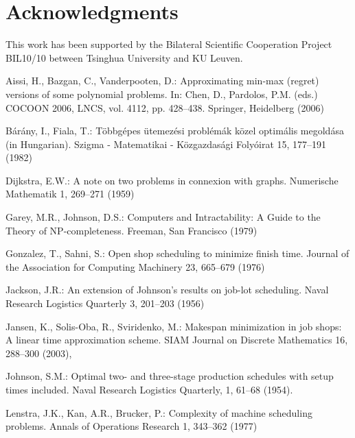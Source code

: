 \documentclass{llncs}
\numberwithin{subcase}{case}
\begin{document}
\section*{Acknowledgments}
This work has been supported by the Bilateral Scientific Cooperation Project BIL10/10 between Tsinghua University and KU Leuven.




\begin{thebibliography}{10}
\providecommand{\url}[1]{\texttt{#1}}
\providecommand{\urlprefix}{URL }

Aissi, H., Bazgan, C., Vanderpooten, D.: Approximating min-max (regret)
  versions of some polynomial problems. In: Chen, D., Pardolos, P.M. (eds.)
  COCOON 2006, LNCS, vol. 4112, pp. 428--438. Springer, Heidelberg (2006)

B{\' a}r{\' a}ny, I., Fiala, T.: T{\" o}bbg{\' e}pes {\" u}temez{\' e}si
  probl{\' e}m{\' a}k k{\" o}zel optim{\' a}lis megold{\' a}sa (in Hungarian).
  Szigma - Matematikai - K{\" o}zgazdas{\' a}gi Foly{\' o}irat  15,  177--191
  (1982)

Dijkstra, E.W.: A note on two problems in connexion with graphs. Numerische
  Mathematik  1, 269--271 (1959)

Garey, M.R., Johnson, D.S.: Computers and Intractability: A Guide to the Theory
  of $\mathrm{NP}$-completeness. Freeman, San Francisco (1979)

Gonzalez, T., Sahni, S.: Open shop scheduling to minimize finish time. Journal
  of the Association for Computing Machinery  23,  665--679 (1976)

Jackson, J.R.: An extension of Johnson's results on job-lot scheduling. Naval
  Research Logistics Quarterly  3, 201--203 (1956)

Jansen, K., Solis-Oba, R., Sviridenko, M.: Makespan minimization in job shops:
  A linear time approximation scheme. SIAM Journal on Discrete Mathematics  16,
   288--300 (2003),

 Johnson, S.M.: Optimal two- and three-stage production schedules with setup times
  included. Naval Research Logistics Quarterly, 1, 61--68 (1954).

Lenstra, J.K., Kan, A.R., Brucker, P.: Complexity of machine scheduling
  problems. Annals of Operations Research  1,  343--362 (1977)


\end{thebibliography}
\end{document}
